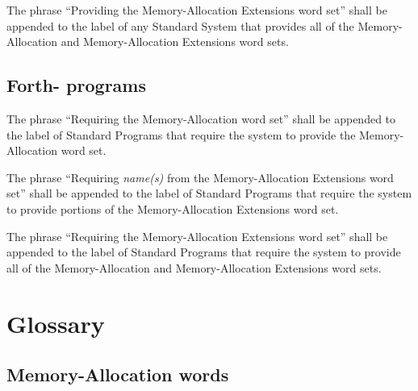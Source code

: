 The phrase ``Providing the Memory-Allocation Extensions word set''
shall be appended to the label of any Standard System that provides
all of the Memory-Allocation and Memory-Allocation Extensions word
sets.

\subsection{Forth-\snapshot{} programs} %

The phrase ``Requiring the Memory-Allocation word set'' shall be
appended to the label of Standard Programs that require the system
to provide the Memory-Allocation word set.

The phrase ``Requiring \emph{name(s)} from the Memory-Allocation
Extensions word set'' shall be appended to the label of Standard
Programs that require the system to provide portions of the
Memory-Allocation Extensions word set.

The phrase ``Requiring the Memory-Allocation Extensions word set''
shall be appended to the label of Standard Programs that require
the system to provide all of the Memory-Allocation and
Memory-Al\-lo\-ca\-tion Extensions word sets.

\section{Glossary} %

\subsection{Memory-Allocation words} %

